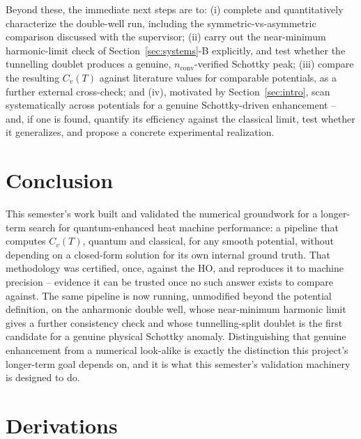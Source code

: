 \documentclass[10pt,conference]{IEEEtran}
\begin{document}
Beyond these, the immediate next steps are to: (i) complete and quantitatively characterize the double-well run, including the symmetric-vs-asymmetric comparison discussed with the supervisor; (ii) carry out the near-minimum harmonic-limit check of Section~\ref{sec:systems}-B explicitly, and test whether the tunnelling doublet produces a genuine, $n_{\text{conv}}$-verified Schottky peak; (iii) compare the resulting $C_v(T)$ against literature values for comparable potentials, as a further external cross-check; and (iv), motivated by Section~\ref{sec:intro}, scan systematically across potentials for a genuine Schottky-driven enhancement -- and, if one is found, quantify its efficiency against the classical limit, test whether it generalizes, and propose a concrete experimental realization.

\section{Conclusion}
This semester's work built and validated the numerical groundwork for a longer-term search for quantum-enhanced heat machine performance: a pipeline that computes $C_v(T)$, quantum and classical, for any smooth potential, without depending on a closed-form solution for its own internal ground truth. That methodology was certified, once, against the HO, and reproduces it to machine precision -- evidence it can be trusted once no such answer exists to compare against. The same pipeline is now running, unmodified beyond the potential definition, on the anharmonic double well, whose near-minimum harmonic limit gives a further consistency check and whose tunnelling-split doublet is the first candidate for a genuine physical Schottky anomaly. Distinguishing that genuine enhancement from a numerical look-alike is exactly the distinction this project's longer-term goal depends on, and it is what this semester's validation machinery is designed to do.

\appendix
\section{Derivations}
\label{sec:derivations}
\end{document}
